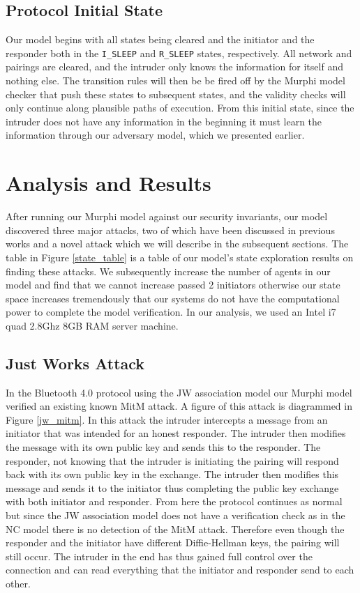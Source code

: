 \documentclass{acm_proc_article-sp}
\begin{document}
\subsection{Protocol Initial State}
Our model begins with all states being cleared and the initiator and the responder both in the \texttt{I\_SLEEP} and \texttt{R\_SLEEP} states, respectively. All network and pairings are cleared, and the intruder only knows the information for itself and nothing else. The transition rules will then be be fired off by the Murphi model checker that push these states to subsequent states, and the validity checks will only continue along plausible paths of execution. From this initial state, since the intruder does not have any information in the beginning it must learn the information through our adversary model, which we presented earlier.

\section{Analysis and Results}

After running our Murphi model against our security invariants, our model discovered three major attacks, two of which have been discussed in previous works \cite{phan:mingard} and a novel attack which we will describe in the subsequent sections. The table in Figure \ref{state_table} is a table of our model's state exploration results on finding these attacks. We subsequently increase the number of agents in our model and find that we cannot increase passed 2 initiators otherwise our state space increases tremendously that our systems do not have the computational power to complete the model verification. In our analysis, we used an Intel i7 quad 2.8Ghz 8GB RAM server machine.

\subsection{Just Works Attack}
In the Bluetooth 4.0 protocol using the JW association model our Murphi model verified an existing known MitM attack. A figure of this attack is diagrammed in Figure \ref{jw_mitm}. In this attack the intruder intercepts a message from an initiator that was intended for an honest responder. The intruder then modifies the message with its own public key and sends this to the responder. The responder, not knowing that the intruder is initiating the pairing will respond back with its own public key in the exchange. The intruder then modifies this message and sends it to the initiator thus completing the public key exchange with both initiator and responder. From here the protocol continues as normal but since the JW association model does not have a verification check as in the NC model there is no detection of the MitM attack. Therefore even though the responder and the initiator have different Diffie-Hellman keys, the pairing will still occur. The intruder in the end has thus gained full control over the connection and can read everything that the initiator and responder send to each other.
\end{document}
